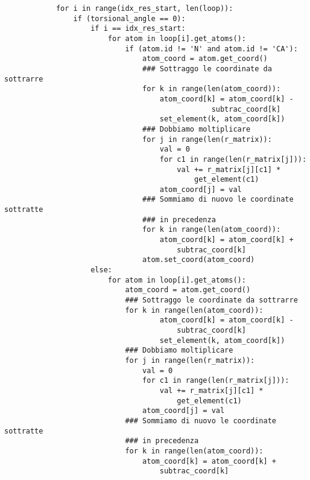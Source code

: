 \begin{verbatim}
            for i in range(idx_res_start, len(loop)):
                if (torsional_angle == 0):
                    if i == idx_res_start:
                        for atom in loop[i].get_atoms():
                            if (atom.id != 'N' and atom.id != 'CA'):
                                atom_coord = atom.get_coord()
                                ### Sottraggo le coordinate da sottrarre
                                for k in range(len(atom_coord)):
                                    atom_coord[k] = atom_coord[k] - 
                                                subtrac_coord[k]
                                    set_element(k, atom_coord[k])
                                ### Dobbiamo moltiplicare
                                for j in range(len(r_matrix)):
                                    val = 0
                                    for c1 in range(len(r_matrix[j])):
                                        val += r_matrix[j][c1] * 
                                            get_element(c1)
                                    atom_coord[j] = val
                                ### Sommiamo di nuovo le coordinate sottratte 
                                ### in precedenza
                                for k in range(len(atom_coord)):
                                    atom_coord[k] = atom_coord[k] + 
                                        subtrac_coord[k]
                                atom.set_coord(atom_coord)
                    else:
                        for atom in loop[i].get_atoms():
                            atom_coord = atom.get_coord()
                            ### Sottraggo le coordinate da sottrarre
                            for k in range(len(atom_coord)):
                                    atom_coord[k] = atom_coord[k] - 
                                        subtrac_coord[k]
                                    set_element(k, atom_coord[k])
                            ### Dobbiamo moltiplicare
                            for j in range(len(r_matrix)):
                                val = 0
                                for c1 in range(len(r_matrix[j])):
                                    val += r_matrix[j][c1] * 
                                        get_element(c1)
                                atom_coord[j] = val
                            ### Sommiamo di nuovo le coordinate sottratte 
                            ### in precedenza
                            for k in range(len(atom_coord)):
                                atom_coord[k] = atom_coord[k] + 
                                    subtrac_coord[k]

\end{verbatim}
